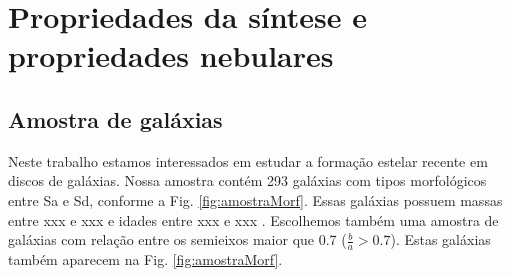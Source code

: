 


\chapter{Propriedades da síntese e propriedades nebulares}
\label{sec:synvsneb}

\section{Amostra de galáxias}
\label{sec:synvsneb:amostra}

Neste trabalho estamos interessados em estudar a formação estelar recente em discos de galáxias.
Nossa amostra contém 293 galáxias com tipos morfológicos entre Sa e Sd, conforme a Fig.
\ref{fig:amostraMorf}. Essas galáxias possuem massas entre \ojo xxx e xxx e idades entre xxx e xxx
. Escolhemos também uma amostra de galáxias com relação entre os
semieixos maior que 0.7 ($\frac{b}{a} > 0.7$). Estas galáxias também aparecem na Fig.
\ref{fig:amostraMorf}.

